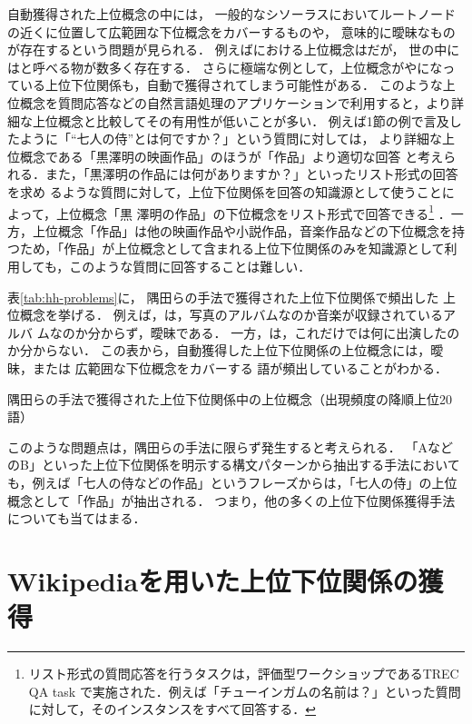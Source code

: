 \documentclass[japanese]{jnlp_1.4}
\newcommand{\xmp}[1]{}
\newcommand{\isa}[2]{}
\begin{document}
自動獲得された上位概念の中には，
一般的なシソーラスにおいてルートノードの近くに位置して広範囲な下位概念をカバーするものや，
意味的に曖昧なものが存在するという問題が見られる．
例えば\isa{作品}{七人の侍}における上位概念は\xmp{作品}だが，
世の中には\xmp{作品}と呼べる物が数多く存在する．
さらに極端な例として，上位概念が\xmp{物}や\xmp{事}になっている上位下位関係も，自動で獲得されてしまう可能性がある．
このような上位概念を質問応答などの自然言語処理のアプリケーションで利用すると，より詳細な上位概念と比較してその有用性が低いことが多い．
例えば1節の例で言及したように「``七人の侍''とは何ですか？」という質問に対しては，
より詳細な上位概念である「黒澤明の映画作品」のほうが「作品」より適切な回答
と考えられる．また，「黒澤明の作品には何がありますか？」といったリスト形式の回答を求め
るような質問に対して，上位下位関係を回答の知識源として使うことによって，上位概念「黒
澤明の作品」の下位概念をリスト形式で回答できる\footnote{リスト形式の質問応答を行うタスクは，評価型ワークショップであるTREC QA task \cite{Dang2006,Dang2007}
で実施された．例えば「チューインガムの名前は？」といった質問に対して，そのインスタンスをすべて回答する．}
．一方，上位概念「作品」は他の映画作品や小説作品，音楽作品などの下位概念を持つため，「作品」が上位概念として含まれる上位下位関係のみを知識源として利用しても，このような質問に回答することは難しい．

表\ref{tab:hh-problems}に，
隅田らの手法で獲得された上位下位関係で頻出した
上位概念を挙げる．
例えば，\xmp{アルバム}は，写真のアルバムなのか音楽が収録されているアルバ
ムなのか分からず，曖昧である．
一方，\xmp{出演者}は，これだけでは何に出演したのか分からない．
この表から，自動獲得した上位下位関係の上位概念には，曖昧，または
広範囲な下位概念をカバーする
語が頻出していることがわかる．

\begin{table}[b]
\caption{隅田らの手法で獲得された上位下位関係中の上位概念（出現頻度の降順上位20語）}
\label{tab:hh-problems}

\end{table}


このような問題点は，隅田らの手法に限らず発生すると考えられる．
「AなどのB」といった上位下位関係を明示する構文パターンから抽出する手法\cite{hearst92}においても，例えば「七人の侍などの作品」というフレーズからは，「七人の侍」の上位概念として「作品」が抽出される．
つまり，他の多くの上位下位関係獲得手法についても当てはまる．



\section{Wikipediaを用いた上位下位関係の獲得
\label{sec:Base-hh}}
\end{document}
